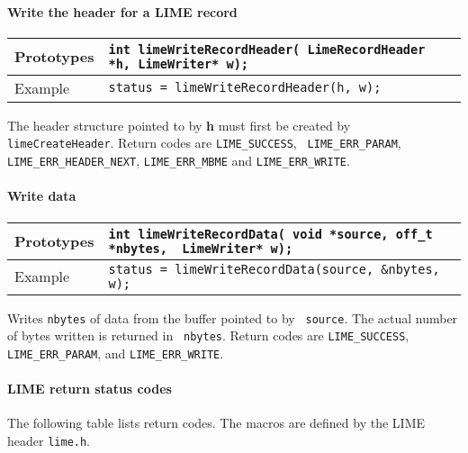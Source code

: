 \documentclass{article}
\begin{document}
\paragraph{Write the header for a LIME record}
%
\begin{flushleft}
  \begin{tabular}{|l|l|}
  \hline
  Prototypes     & \verb|int limeWriteRecordHeader( LimeRecordHeader *h, LimeWriter* w);| \\
\hline
  Example  & \verb|status = limeWriteRecordHeader(h, w);| \\
   \hline
 \end{tabular}
\end{flushleft}
%
The header structure pointed to by {\bf h} must first be created by
{\tt limeCreateHeader}.  Return codes are {\tt LIME\_SUCCESS}, {\tt
LIME\_ERR\_PARAM}, {\tt LIME\_ERR\_HEADER\_NEXT}, {\tt LIME\_ERR\_MBME} and
{\tt LIME\_ERR\_WRITE}.

\paragraph{Write data}
%
\begin{flushleft}
  \begin{tabular}{|l|l|}
  \hline
  Prototypes     & \verb|int limeWriteRecordData( void *source, off_t *nbytes,  LimeWriter* w);| \\
\hline
  Example  & \verb|status = limeWriteRecordData(source, &nbytes, w);| \\
   \hline
 \end{tabular}
\end{flushleft}
%
Writes {\tt nbytes} of data from the buffer pointed to by {\tt
source}.  The actual number of bytes written is returned in {\tt
nbytes}.  Return codes are {\tt LIME\_SUCCESS}, {\tt LIME\_ERR\_PARAM},
and {\tt LIME\_ERR\_WRITE}.


\paragraph{LIME return status codes}

The following table lists return codes.  The macros are defined by the LIME
header {\tt lime.h}.
\end{document}
